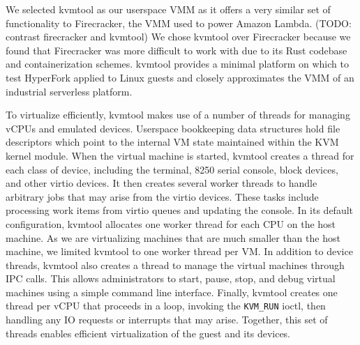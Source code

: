 We selected kvmtool as our userspace VMM as it offers a very similar set of
functionality to Firecracker, the VMM used to power Amazon Lambda. (TODO:
contrast firecracker and kvmtool) We chose kvmtool over Firecracker because we
found that Firecracker was more difficult to work with due to its Rust codebase
and containerization schemes. kvmtool provides a minimal platform on which to
test HyperFork applied to Linux guests and closely approximates the VMM of an
industrial serverless platform.

To virtualize efficiently, kvmtool makes use of a number of threads for
managing vCPUs and emulated devices. Userspace bookkeeping data structures hold
file descriptors which point to the internal VM state maintained within the KVM
kernel module. When the virtual machine is started, kvmtool creates a thread
for each class of device, including the terminal, 8250 serial console, block
devices, and other virtio devices. It then creates several worker threads to
handle arbitrary jobs that may arise from the virtio devices. These tasks
include processing work items from virtio queues and updating the console. In
its default configuration, kvmtool allocates one worker thread for each CPU on
the host machine. As we are virtualizing machines that are much smaller than
the host machine, we limited kvmtool to one worker thread per VM. In addition
to device threads, kvmtool also creates a thread to manage the virtual machines
through IPC calls. This allows administrators to start, pause, stop, and debug
virtual machines using a simple command line interface. Finally, kvmtool
creates one thread per vCPU that proceeds in a loop, invoking the
\texttt{KVM\_RUN} ioctl, then handling any IO requests or interrupts that may
arise. Together, this set of threads enables efficient virtualization of the
guest and its devices.

